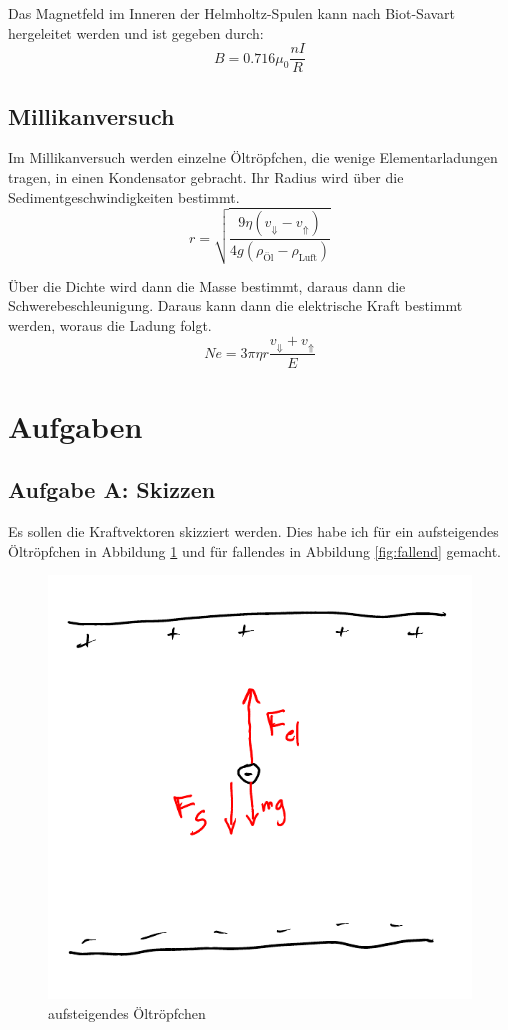 \documentclass[11pt, ngerman]{article}
\begin{document}
Das Magnetfeld im Inneren der Helmholtz-Spulen kann nach Biot-Savart
hergeleitet werden und ist gegeben durch:
\begin{equation}
	\label{eq:Helmholtz}
	B = 0.716 \mu_0 \frac{nI}R
\end{equation}

\subsection{Millikanversuch}

Im Millikanversuch werden einzelne Öltröpfchen, die wenige Elementarladungen
tragen, in einen Kondensator gebracht. Ihr Radius wird über die
Sedimentgeschwindigkeiten bestimmt.
%
\begin{equation}
	\label{eq:249.8}
	r = \sqrt{\frac{9 \eta \left( v_\Downarrow - v_\Uparrow \right)}{4 g (\rho_\text{Öl} - \rho_\text{Luft})}}
\end{equation}

Über die Dichte wird dann die Masse bestimmt, daraus dann die
Schwerebeschleunigung. Daraus kann dann die elektrische Kraft bestimmt werden,
woraus die Ladung folgt.
%
\begin{equation}
	\label{eq:249.9}
	N e = 3 \pi \eta r \frac{v_\Downarrow + v_\Uparrow }E
\end{equation}


\section{Aufgaben}

\subsection{Aufgabe A: Skizzen}

Es sollen die Kraftvektoren skizziert werden. Dies habe ich für ein
aufsteigendes Öltröpfchen in Abbildung \ref{fig:aufsteigend} und für fallendes
in Abbildung \ref{fig:fallend} gemacht.

\begin{figure}[h!]
	\centering
	\includegraphics[width=.5\textwidth]{aufsteigend.pdf}
	\caption{aufsteigendes Öltröpfchen}
	\label{fig:aufsteigend}
\end{figure}
\end{document}
